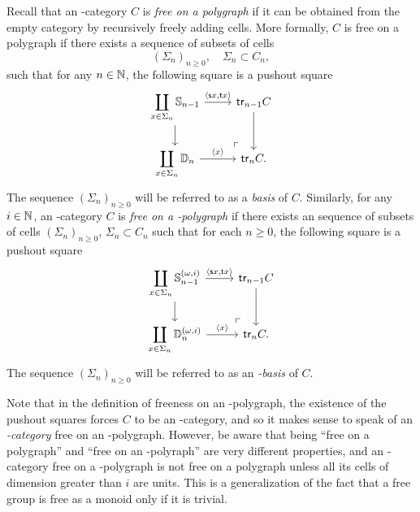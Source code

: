 \documentclass{amsart}
\newcommand{\src}[1]{\source{} #1}
\newcommand{\tgt}[1]{\target{} #1}
\begin{document}
\begin{paragr}
  Recall that an \oo\nbd-category $C$ is \emph{free on a polygraph} if
  it
  can be obtained from the empty category by recursively freely adding
  cells. More formally, $C$ is free on a polygraph if there exists a
  sequence of subsets of cells
  \[
    (\Sigma_n)_{n \geq 0}, \quad \Sigma_n \subset C_n,
  \]
  such that for any $n \in \mathbb N$, the following square is a pushout square
  \[
    \begin{tikzcd}
     \displaystyle \coprod_{x \in \Sigma_n} \Sph{n-1}
     \ar[d]\ar[r,"{\langle \src x, \tgt x \rangle}"] & \trk{n-1}C \ar[d]\\
     \displaystyle \coprod_{x \in \Sigma_n}\Dsk{n} \ar[r,"\langle x \rangle"] & \trk{n}C.
     \ar[from=1-1,to=2-2,phantom, very near end, "\ulcorner"]
    \end{tikzcd}
  \]
  The sequence $(\Sigma_n)_{n \geq 0}$ will be referred to as a \emph{basis} of
  $C$. Similarly, for any $i \in \mathbb N$, an \nbd-category $C$ is \emph{free on a
  \nbd-polygraph} if there exists an sequence of subsets of cells
  $(\Sigma_n)_{n \geq 0}$, $\Sigma_n \subset C_n$ such that for each
  $n \geq 0$, the following square is a pushout square
  \[
    \begin{tikzcd}
    \displaystyle \coprod_{x \in \Sigma_n} \Sph{n-1}^{(\omega,i)}
     \ar[d]\ar[r,"{\langle \src x, \tgt x \rangle}"] & \trk{n-1}C \ar[d]\\
     \displaystyle \coprod_{x \in \Sigma_n}\Dsk{n}^{(\omega,i)} \ar[r,"\langle x \rangle"] & \trk{n}C.
     \ar[from=1-1,to=2-2,phantom, very near end, "\ulcorner"]
    \end{tikzcd}
  \]
  The sequence $(\Sigma_n)_{n \geq 0}$ will be referred to as an
\emph{\nbd-basis} of $C$.
\end{paragr}
\begin{remark}\label{rmk:ookpol}
    Note that in the definition of freeness on an \nbd-polygraph,
    the existence of the pushout squares forces $C$ to be an
  \nbd-category, and so it makes sense to speak of an
  \emph{\oo\nbd-category} free on an \nbd-polygraph. However,
  be aware that
  being ``free on a polygraph'' and ``free on an
  \nbd-polyraph'' are very different properties, and an
  \oo\nbd-category free on a \nbd-polygraph is not free on a
  polygraph unless all its cells of dimension greater than $i$ are
  units. This is a generalization of the fact that a free group is free as a monoid only if
  it is trivial.
\end{remark}
\end{document}

